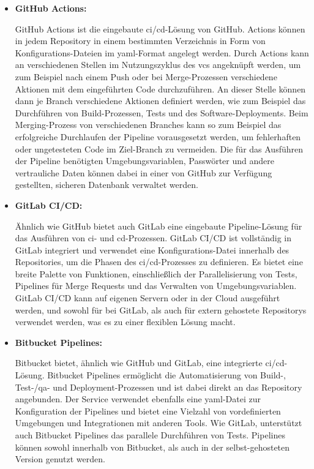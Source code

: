 \begin{itemize}
    \item{
        \textbf{GitHub Actions:}\par
        GitHub Actions ist die eingebaute \acrshort{ci}/\acrshort{cd}-Lösung von GitHub.
        Actions können in jedem Repository in einem bestimmten Verzeichnis in Form von Konfigurations-Dateien im
        \acrshort{yaml}-Format angelegt werden.
        Durch Actions kann an verschiedenen Stellen im Nutzungszyklus des \acrshort{vcs} angeknüpft werden, um zum
        Beispiel nach einem Push oder bei Merge-Prozessen verschiedene Aktionen mit dem eingeführten Code durchzuführen.
        An dieser Stelle können dann je Branch verschiedene Aktionen definiert werden, wie zum Beispiel das Durchführen
        von Build-Prozessen, Tests und des Software-Deployments.
        Beim Merging-Prozess von verschiedenen Branches kann so zum Beispiel das erfolgreiche Durchlaufen der Pipeline
        vorausgesetzt werden, um fehlerhaften oder ungetesteten Code im Ziel-Branch zu vermeiden.
        Die für das Ausführen der Pipeline benötigten Umgebungsvariablen, Passwörter und andere vertrauliche Daten
        können dabei in einer von GitHub zur Verfügung gestellten, sicheren Datenbank verwaltet werden.
    }

    \item{
        \textbf{GitLab CI/CD:}\par
        Ähnlich wie GitHub bietet auch GitLab eine eingebaute Pipeline-Lösung für das Ausführen von \acrshort{ci}- und
        \acrshort{cd}-Prozessen.
        GitLab CI/CD ist vollständig in GitLab integriert und verwendet eine Konfigurations-Datei innerhalb des
        Repositories, um die Phasen des \acrshort{ci}/\acrshort{cd}-Prozesses zu definieren.
        Es bietet eine breite Palette von Funktionen, einschließlich der Parallelisierung von Tests, Pipelines für Merge
        Requests und das Verwalten von Umgebungsvariablen.
        GitLab CI/CD kann auf eigenen Servern oder in der Cloud ausgeführt werden, und sowohl für bei GitLab, als auch
        für extern gehostete Repositorys verwendet werden, was es zu einer flexiblen Lösung macht.
    }

    \item{
        \textbf{Bitbucket Pipelines:}\par
        Bitbucket bietet, ähnlich wie GitHub und GitLab, eine integrierte \acrshort{ci}/\acrshort{cd}-Lösung.
        Bitbucket Pipelines ermöglicht die Automatisierung von Build-, Test-/\acrshort{qa}- und Deployment-Prozessen und
        ist dabei direkt an das Repository angebunden.
        Der Service verwendet ebenfalls eine \acrshort{yaml}-Datei zur Konfiguration der Pipelines und bietet eine
        Vielzahl von vordefinierten Umgebungen und Integrationen mit anderen Tools.
        Wie GitLab, unterstützt auch Bitbucket Pipelines das parallele Durchführen von Tests.
        Pipelines können sowohl innerhalb von Bitbucket, als auch in der selbst-gehosteten Version genutzt werden.
    }


\end{itemize}
